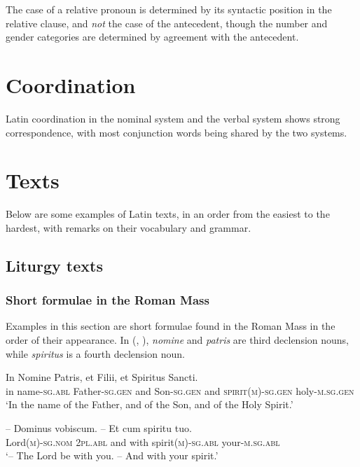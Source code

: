 \documentclass[a4paper, oneside, 12pt]{report}
\newcommand{\form}[1]{\emph{#1}}
\newcommand*{\category}[1]{\textsc{#1}}
\newcommand{\translate}[1]{`#1'}
\begin{document}
The case of a relative pronoun is determined 
by its syntactic position in the relative clause, 
and \emph{not} the case of the antecedent,
though the number and gender categories 
are determined by agreement with the antecedent.

\chapter{Coordination}

Latin coordination in the nominal system and the verbal system 
shows strong correspondence,
with most conjunction words being shared
by the two systems.


\chapter{Texts}

Below are some examples of Latin texts, 
in an order from the easiest to the hardest,
with remarks on their vocabulary and grammar. 

\section{Liturgy texts}

\subsection{Short formulae in the Roman Mass}

Examples in this section are short formulae found in the Roman Mass
in the order of their appearance.
In (, ),
\form{nomine} and \form{patris} are third declension nouns, 
while \form{spiritus} is a fourth declension noun. 

\begin{exe}
    \ex\label{ex:text.mass.1} \gll In Nomine Patris, et Filii, et Spiritus Sancti. \\
    in name-\category{sg}.\category{abl} Father-\category{sg}.\category{gen} 
    and Son-\category{sg}.\category{gen} 
    and \category{spirit}(\category{m})-\category{sg}.\category{gen}
    holy-\category{m}.\category{sg}.\category{gen} \\
    \glt \translate{In the name of the Father, and of the Son, and of the Holy Spirit.}

    \ex\label{ex:text.mass.2} \gll -- Dominus vobiscum. -- Et cum spiritu tuo. \\
    {} Lord(\category{m})-\category{sg}.\category{nom} 
    \category{2pl}.\category{abl} 
    {} and with spirit(\category{m})-\category{sg}.\category{abl} 
    your-\category{m}.\category{sg}.\category{abl} \\
    \glt \translate{-- The Lord be with you. -- And with your spirit.}
    
    \ex 
\end{exe}
\end{document}
